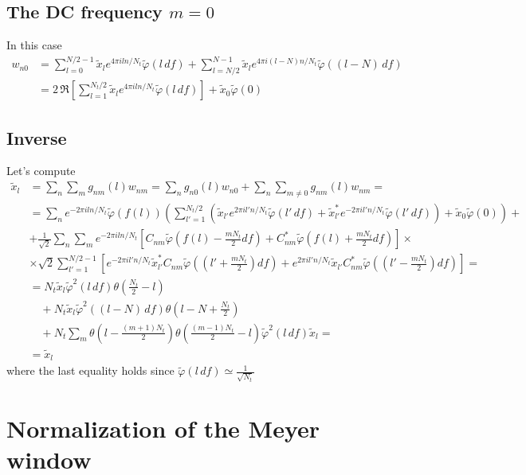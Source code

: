 \documentclass[%
 reprint,
superscriptaddress,
nofootinbib,
 amsmath,amssymb,
 aps,
colorlinks = true, 
linkcolor = blue, 
urlcolor = blue, 
citecolor = blue, 
anchorcolor = blue,
]{revtex4-2}
\begin{document}
\subsection{The DC frequency $m=0$}
In this case
%
\begin{align}
w_{n0}&=\sum_{l=0}^{N/2-1} \tilde{x}_l e^{4\pi iln/N_t}\tilde{\varphi}(l\,df)
+\sum_{l=N/2}^{N-1} \tilde{x}_l e^{4\pi i(l-N)n/N_t}\tilde{\varphi}((l-N)\,df)
\nonumber\\
&=2\,\Re\left[\sum_{l=1}^{N_t/2} \tilde{x}_{l} e^{4\pi iln/N_t}\tilde{\varphi}(l\,df)\right]+\tilde{x}_0\tilde{\varphi}(0)
\end{align}
%

\subsection{Inverse}
Let's compute
%
\begin{align}
\tilde x_l &= \sum_n\sum_m g_{nm}(l) w_{nm}=\sum_n g_{n0}(l) w_{n0}+\sum_n \sum_{m\neq 0} g_{nm}(l) w_{nm}=\nonumber\\
&=\sum_n e^{-2\pi iln/N_t}\tilde{\varphi}(f(l))\left(\sum_{l'=1}^{N_t/2} (\tilde{x}_{l'} e^{2\pi il'n/N_t}\tilde{\varphi}(l'\,df)+\tilde{x}^*_{l'} e^{-2\pi il'n/N_t}\tilde{\varphi}(l'\,df))+\tilde{x}_0\tilde{\varphi}(0)\right)+\nonumber\\
&+\frac{1}{\sqrt{2}}\sum_n\sum_m e^{-2\pi iln/N_t}\left[C_{nm}\tilde{\varphi}\left(f(l)-\frac{mN_t}{2}df\right)+C_{nm}^*\tilde{\varphi}\left(f(l)+\frac{mN_t}{2}df\right)\right]\times\nonumber\\
&\times\sqrt{2}\sum_{l'=1}^{N/2-1}\left[e^{-2\pi il'n/N_t}\tilde x^*_{l'}C_{nm}\tilde{\varphi}\left((l'+\frac{mN_t}{2})df\right)+e^{2\pi il'n/N_t}\tilde x_{l'}C_{nm}^*\tilde{\varphi}\left((l'-\frac{mN_t}{2})df\right)\right]=\nonumber\\
&=
N_t\tilde x_l\tilde{\varphi}^2(l\,df)\theta\left(\frac{N_t}{2}-l\right)\nonumber\\
&\quad+N_t\tilde x_l\tilde{\varphi}^2((l-N)\,df)\theta\left(l-N+\frac{N_t}{2}\right)\nonumber\\
&\quad+N_t\sum_m \theta\left(l-\frac{(m+1)N_t}{2}\right)\theta\left(\frac{(m-1)N_t}{2}-l\right)\tilde\varphi^2(l\,df)\tilde x_l=\nonumber\\
&=\tilde x_l
\end{align}
%
where the last equality holds since $\tilde\varphi(l\,df)\simeq \frac{1}{\sqrt{N_t}}$

\section{Normalization of the Meyer window}\label{app:normalization_Meyer}
\end{document}
